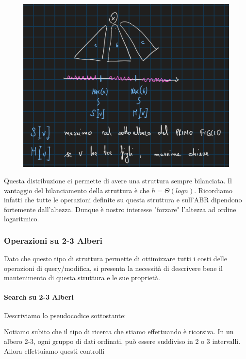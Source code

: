 \documentclass{article}
\begin{document}
\begin{figure}[htbp]
        \center
        \includegraphics[scale=0.45]{img/distribuzione2-3.png}
\end{figure}

Questa distribuzione ci permette di avere una struttura sempre bilanciata. Il vantaggio del bilanciamento della struttura è che $h=\Theta(log n)$. Ricordiamo infatti che tutte le operazioni definite su questa struttura e sull'ABR dipendono fortemente dall'altezza. Dunque è nostro interesse "forzare" l'altezza ad ordine logaritmico.

\newpage

\subsubsection{Operazioni su 2-3 Alberi} Dato che questo tipo di struttura permette di ottimizzare tutti i costi delle operazioni di query/modifica, si presenta la necessità di descrivere bene il mantenimento di questa struttura e le sue proprietà.

\paragraph{Search su 2-3 Alberi} Descriviamo lo pseudocodice sottostante:

Notiamo subito che il tipo di ricerca che stiamo effettuando è ricorsiva.
In un albero 2-3, ogni gruppo di dati ordinati, può essere suddiviso in 2 o 3 intervalli.
Allora effettuiamo questi controlli
\end{document}
